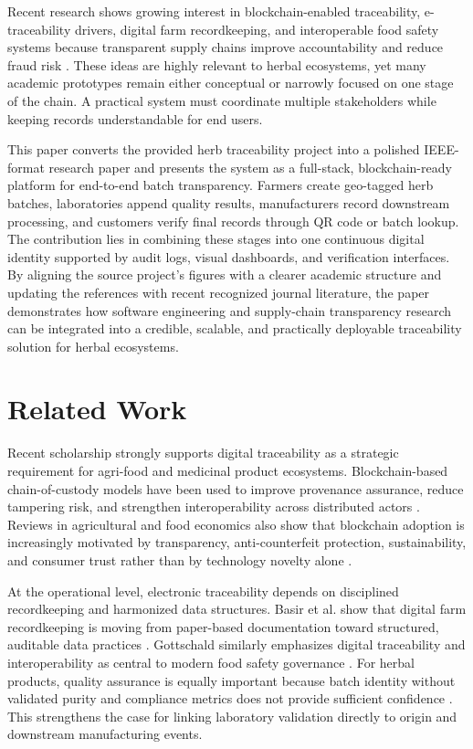 \documentclass[conference]{IEEEtran}
\begin{document}
Recent research shows growing interest in blockchain-enabled traceability, e-traceability drivers, digital farm recordkeeping, and interoperable food safety systems because transparent supply chains improve accountability and reduce fraud risk \cite{azevedo2023,marchese2022,krstic2023,basir2024,gottschald2024}. These ideas are highly relevant to herbal ecosystems, yet many academic prototypes remain either conceptual or narrowly focused on one stage of the chain. A practical system must coordinate multiple stakeholders while keeping records understandable for end users.

This paper converts the provided herb traceability project into a polished IEEE-format research paper and presents the system as a full-stack, blockchain-ready platform for end-to-end batch transparency. Farmers create geo-tagged herb batches, laboratories append quality results, manufacturers record downstream processing, and customers verify final records through QR code or batch lookup. The contribution lies in combining these stages into one continuous digital identity supported by audit logs, visual dashboards, and verification interfaces. By aligning the source project's figures with a clearer academic structure and updating the references with recent recognized journal literature, the paper demonstrates how software engineering and supply-chain transparency research can be integrated into a credible, scalable, and practically deployable traceability solution for herbal ecosystems.

\section{Related Work}

Recent scholarship strongly supports digital traceability as a strategic requirement for agri-food and medicinal product ecosystems. Blockchain-based chain-of-custody models have been used to improve provenance assurance, reduce tampering risk, and strengthen interoperability across distributed actors \cite{azevedo2023,marchese2022,li2024}. Reviews in agricultural and food economics also show that blockchain adoption is increasingly motivated by transparency, anti-counterfeit protection, sustainability, and consumer trust rather than by technology novelty alone \cite{gambi2024,chen2026,ghode2025,ma2025}.

At the operational level, electronic traceability depends on disciplined recordkeeping and harmonized data structures. Basir et al. show that digital farm recordkeeping is moving from paper-based documentation toward structured, auditable data practices \cite{basir2024}. Gottschald similarly emphasizes digital traceability and interoperability as central to modern food safety governance \cite{gottschald2024}. For herbal products, quality assurance is equally important because batch identity without validated purity and compliance metrics does not provide sufficient confidence \cite{edo2024}. This strengthens the case for linking laboratory validation directly to origin and downstream manufacturing events.
\end{document}
